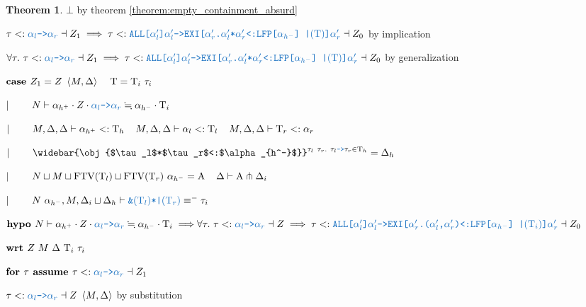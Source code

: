 \documentclass[acmsmall]{acmart}
\theoremstyle{definition}
\newtheorem{theorem}{Theorem}[section]
\begin{document}
\begin{theorem}
        \item \Z\Z\Z\Z $\bot$ by theorem \ref{theorem:empty_containment_absurd}
      \item \Z\Z\Z $
        \tau \subtypes \obj{$\alpha_l$->$\alpha_r$} \given Z_1
        \implies
        \tau
        \subtypes
        \obj{ALL[$\alpha_l'$]$\alpha_l'$->EXI[$\alpha_r'$.$\alpha_l'$*$\alpha_r'$<:LFP[$\alpha_{h^-}$] |$(\Tau)$]$\alpha_r'$} 
        \given Z_0
      $ by implication
    \item \Z\Z $
      \forall \tau .\ 
      \tau \subtypes \obj{$\alpha_l$->$\alpha_r$} \given Z_1
      \implies
      \tau
      \subtypes
      \obj{ALL[$\alpha_l'$]$\alpha_l'$->EXI[$\alpha_r'$.$\alpha_l'$*$\alpha_r'$<:LFP[$\alpha_{h^-}$] |$(\Tau)$]$\alpha_r'$} 
      \given Z_0
    $ by generalization 
  \item \Z $\B{case }
    Z_1 = Z\ \left<M, \Delta \right> \I \Tau = \Tau_i\ \tau_i
  $
  \item \Z $\contin
    N \entails 
    \alpha_{h^+} \cdot Z \cdot \obj{$\alpha_l$->$\alpha_r$} 
    \fallingdotseq 
    \alpha_{h^-} \cdot \Tau_i
  $
  \item \Z $|\ \ \ \ \ \ \ 
    M, \Delta, \Delta \vdash \alpha_{h^+} <: \mathrm{T}_h
    \hspace{4mm}
    M, \Delta, \Delta \vdash \alpha_l <: \mathrm{T}_l 
    \hspace{4mm}
    M, \Delta, \Delta \vdash \mathrm{T}_r <: \alpha_r
  $
  \item \Z $\contin
    \widebar{\obj{$\tau_l$*$\tau_r$<:$\alpha_{h^-}$}}^{\tau_l\ \tau_r .\ \tau_l\obj{->}\tau_r \in \Tau_h} = \Delta_h
  $
  \item \Z $\contin
    N \sqcup M \sqcup \text{FTV}(\Tau_l) \sqcup \text{FTV}(\Tau_r)\ \alpha_{h^-} = \Alpha 
    \I
    \Delta \entails \Alpha \pitchfork \Delta_i  
  $
  \item \Z $\contin
    N\ \alpha_{h^-}, M, \Delta_i \sqcup \Delta_h \entails \obj{\&$(\Tau_l)$*|$(\Tau_r)$} \equiv^{-} \tau_i
  $
  \item \Z $\B{hypo }
    N \entails 
    \alpha_{h^+} \cdot Z \cdot \obj{$\alpha_l$->$\alpha_r$} 
    \fallingdotseq 
    \alpha_{h^-} \cdot \Tau_i
    \implies
    \\
    \forall \tau .\ 
    \tau \subtypes \obj{$\alpha_l$->$\alpha_r$} \given Z
    \implies
    \tau
    \subtypes
    \obj{ALL[$\alpha_l'$]$\alpha_l'$->EXI[$\alpha_r'$.($\alpha_l'$,$\alpha_r'$)<:LFP[$\alpha_{h^-}$] |$(\Tau_i)$]$\alpha_r'$} 
    \given Z_0
  $
  \item \Z $\textbf{wrt }
    Z\ M\ \Delta\ \mathrm{T}_i\ \tau_i
  $

    \item \Z\Z $\B{for } \tau \B{ assume }
      \tau \subtypes \obj{$\alpha_l$->$\alpha_r$} \given Z_1
    $
      \item \Z\Z\Z $
        \tau \subtypes \obj{$\alpha_l$->$\alpha_r$} \given Z\ \left<M, \Delta\right>
      $ by substitution


\end{theorem}
\end{document}
